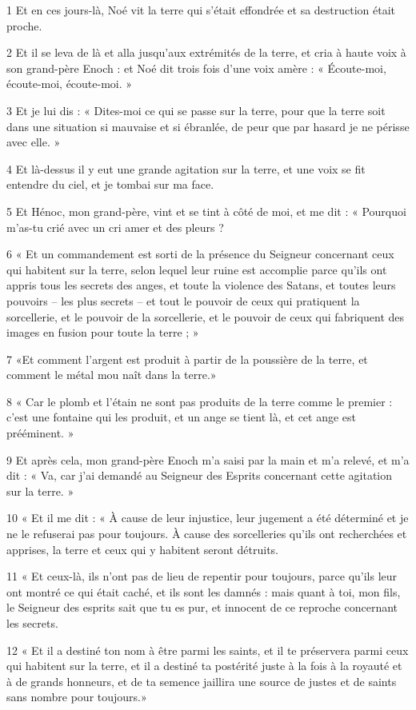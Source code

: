 \par 1 Et en ces jours-là, Noé vit la terre qui s'était effondrée et sa destruction était proche.
\par 2 Et il se leva de là et alla jusqu'aux extrémités de la terre, et cria à haute voix à son grand-père Enoch : et Noé dit trois fois d'une voix amère : « Écoute-moi, écoute-moi, écoute-moi. »
\par 3 Et je lui dis : « Dites-moi ce qui se passe sur la terre, pour que la terre soit dans une situation si mauvaise et si ébranlée, de peur que par hasard je ne périsse avec elle. »
\par 4 Et là-dessus il y eut une grande agitation sur la terre, et une voix se fit entendre du ciel, et je tombai sur ma face.
\par 5 Et Hénoc, mon grand-père, vint et se tint à côté de moi, et me dit : « Pourquoi m'as-tu crié avec un cri amer et des pleurs ?
\par 6 « Et un commandement est sorti de la présence du Seigneur concernant ceux qui habitent sur la terre, selon lequel leur ruine est accomplie parce qu'ils ont appris tous les secrets des anges, et toute la violence des Satans, et toutes leurs pouvoirs – les plus secrets – et tout le pouvoir de ceux qui pratiquent la sorcellerie, et le pouvoir de la sorcellerie, et le pouvoir de ceux qui fabriquent des images en fusion pour toute la terre ; »
\par 7 «Et comment l'argent est produit à partir de la poussière de la terre, et comment le métal mou naît dans la terre.»
\par 8 « Car le plomb et l'étain ne sont pas produits de la terre comme le premier : c'est une fontaine qui les produit, et un ange se tient là, et cet ange est prééminent. »
\par 9 Et après cela, mon grand-père Enoch m'a saisi par la main et m'a relevé, et m'a dit : « Va, car j'ai demandé au Seigneur des Esprits concernant cette agitation sur la terre. »
\par 10 « Et il me dit : « À cause de leur injustice, leur jugement a été déterminé et je ne le refuserai pas pour toujours. À cause des sorcelleries qu’ils ont recherchées et apprises, la terre et ceux qui y habitent seront détruits.
\par 11 « Et ceux-là, ils n'ont pas de lieu de repentir pour toujours, parce qu'ils leur ont montré ce qui était caché, et ils sont les damnés : mais quant à toi, mon fils, le Seigneur des esprits sait que tu es pur, et innocent de ce reproche concernant les secrets.
\par 12 « Et il a destiné ton nom à être parmi les saints, et il te préservera parmi ceux qui habitent sur la terre, et il a destiné ta postérité juste à la fois à la royauté et à de grands honneurs, et de ta semence jaillira une source de justes et de saints sans nombre pour toujours.»

